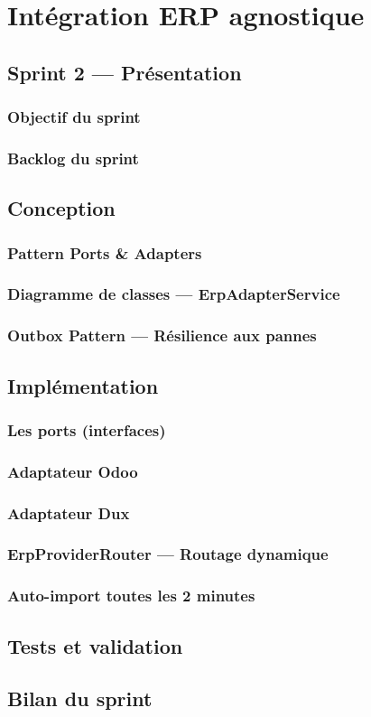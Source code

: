 \chapter{Intégration ERP agnostique}

\section{Sprint 2 — Présentation}

\subsection{Objectif du sprint}
\subsection{Backlog du sprint}

\section{Conception}

\subsection{Pattern Ports \& Adapters}
\subsection{Diagramme de classes — ErpAdapterService}
\subsection{Outbox Pattern — Résilience aux pannes}

\section{Implémentation}

\subsection{Les ports (interfaces)}
\subsection{Adaptateur Odoo}
\subsection{Adaptateur Dux}
\subsection{ErpProviderRouter — Routage dynamique}
\subsection{Auto-import toutes les 2 minutes}

\section{Tests et validation}

\section*{Bilan du sprint}
